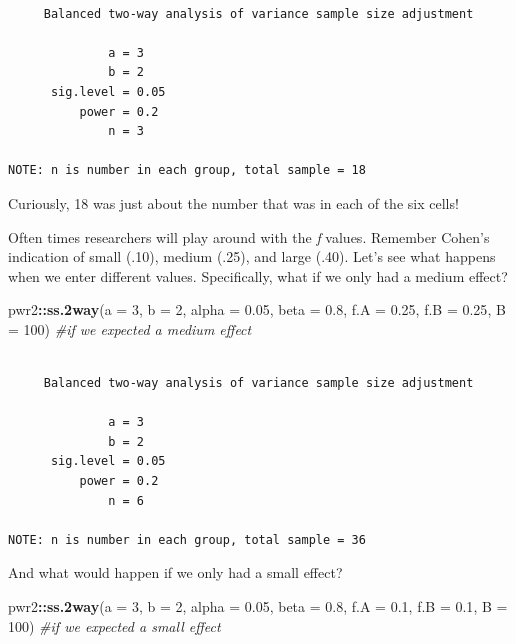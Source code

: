 \documentclass[
  11pt,
]{book}
\newenvironment{Shaded}{\begin{snugshade}}{\end{snugshade}}
\newcommand{\AttributeTok}[1]{\textcolor[rgb]{0.27,0.27,0.27}{#1}}
\newcommand{\CommentTok}[1]{\textcolor[rgb]{0.37,0.37,0.37}{\textit{#1}}}
\newcommand{\DecValTok}[1]{\textcolor[rgb]{0.06,0.06,0.06}{#1}}
\newcommand{\FloatTok}[1]{\textcolor[rgb]{0.06,0.06,0.06}{#1}}
\newcommand{\FunctionTok}[1]{\textcolor[rgb]{0.27,0.27,0.27}{\textbf{#1}}}
\newcommand{\NormalTok}[1]{#1}
\newcommand{\SpecialCharTok}[1]{\textcolor[rgb]{0.43,0.43,0.43}{\textbf{#1}}}
\begin{document}
\begin{verbatim}

     Balanced two-way analysis of variance sample size adjustment 

              a = 3
              b = 2
      sig.level = 0.05
          power = 0.2
              n = 3

NOTE: n is number in each group, total sample = 18
\end{verbatim}

Curiously, 18 was just about the number that was in each of the six cells!

Often times researchers will play around with the \emph{f} values. Remember Cohen's indication of small (.10), medium (.25), and large (.40). Let's see what happens when we enter different values. Specifically, what if we only had a medium effect?

\begin{Shaded}
\begin{Highlighting}[]
\NormalTok{pwr2}\SpecialCharTok{::}\FunctionTok{ss.2way}\NormalTok{(}\AttributeTok{a =} \DecValTok{3}\NormalTok{, }\AttributeTok{b =} \DecValTok{2}\NormalTok{, }\AttributeTok{alpha =} \FloatTok{0.05}\NormalTok{, }\AttributeTok{beta =} \FloatTok{0.8}\NormalTok{, }\AttributeTok{f.A =} \FloatTok{0.25}\NormalTok{, }\AttributeTok{f.B =} \FloatTok{0.25}\NormalTok{,}
    \AttributeTok{B =} \DecValTok{100}\NormalTok{)  }\CommentTok{\#if we expected a medium effect}
\end{Highlighting}
\end{Shaded}

\begin{verbatim}

     Balanced two-way analysis of variance sample size adjustment 

              a = 3
              b = 2
      sig.level = 0.05
          power = 0.2
              n = 6

NOTE: n is number in each group, total sample = 36
\end{verbatim}

And what would happen if we only had a small effect?

\begin{Shaded}
\begin{Highlighting}[]
\NormalTok{pwr2}\SpecialCharTok{::}\FunctionTok{ss.2way}\NormalTok{(}\AttributeTok{a =} \DecValTok{3}\NormalTok{, }\AttributeTok{b =} \DecValTok{2}\NormalTok{, }\AttributeTok{alpha =} \FloatTok{0.05}\NormalTok{, }\AttributeTok{beta =} \FloatTok{0.8}\NormalTok{, }\AttributeTok{f.A =} \FloatTok{0.1}\NormalTok{, }\AttributeTok{f.B =} \FloatTok{0.1}\NormalTok{,}
    \AttributeTok{B =} \DecValTok{100}\NormalTok{)  }\CommentTok{\#if we expected a small effect}
\end{Highlighting}
\end{Shaded}
\end{document}
